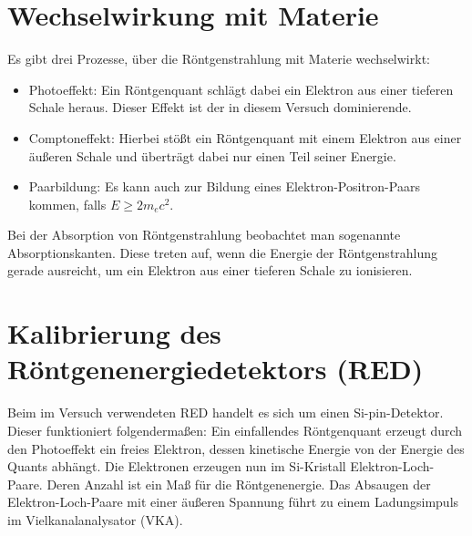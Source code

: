 \section{Wechselwirkung mit Materie}

Es gibt drei Prozesse, über die Röntgenstrahlung mit Materie wechselwirkt: \cite{Dem16}
\begin{itemize}
 \item Photoeffekt: Ein Röntgenquant schlägt dabei ein Elektron aus einer tieferen Schale heraus. Dieser Effekt ist der in diesem Versuch dominierende.
 \item Comptoneffekt: Hierbei stößt ein Röntgenquant mit einem Elektron aus einer äußeren Schale und überträgt dabei nur einen Teil seiner Energie.
 \item Paarbildung: Es kann auch zur Bildung eines Elektron-Positron-Paars kommen, falls $E\geq 2m_{e}c^{2}$.
\end{itemize}
Bei der Absorption von Röntgenstrahlung beobachtet man sogenannte Absorptionskanten. Diese treten auf, wenn die Energie der Röntgenstrahlung gerade ausreicht, um ein Elektron aus einer tieferen Schale zu ionisieren.

\section{Kalibrierung des Röntgenenergiedetektors (RED)}

Beim im Versuch verwendeten RED handelt es sich um einen Si-pin-Detektor. Dieser funktioniert folgendermaßen: Ein einfallendes Röntgenquant erzeugt durch den Photoeffekt ein freies Elektron, dessen kinetische Energie von der Energie des Quants abhängt.
Die Elektronen erzeugen nun im Si-Kristall Elektron-Loch-Paare. Deren Anzahl ist ein Maß für die Röntgenenergie. Das Absaugen der Elektron-Loch-Paare mit einer äußeren Spannung führt zu einem Ladungsimpuls im Vielkanalanalysator (VKA).

